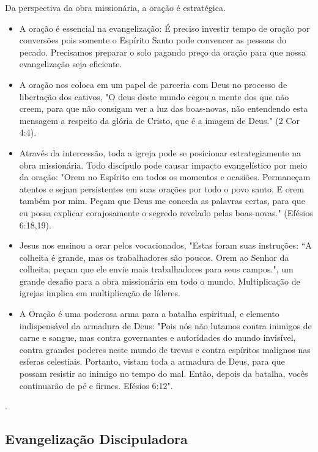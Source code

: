 \documentclass[
	12pt,				%
	openright,			%
	twoside,			%
	a4paper,			%
	english,			%
	french,				%
	spanish,			%
	brazil				%
	]{abntex2}
\begin{document}
  Da perspectiva da obra missionária, a oração é estratégica.
  \begin{itemize}
	\item A oração é essencial na evangelização: É preciso investir tempo de oração por conversões pois somente o Espírito Santo pode convencer as pessoas do pecado. Precisamos preparar o solo pagando preço da oração para que nossa evangelização seja eficiente.
	\item A oração nos coloca em um papel de parceria com Deus no processo de libertação dos cativos, "O deus deste mundo cegou a mente dos que não creem, para que não consigam ver a luz das boas-novas, não entendendo esta mensagem a respeito da glória de Cristo, que é a imagem de Deus." (2 Cor 4:4).
	\item Através da intercessão, toda a igreja pode se posicionar estrategiamente na obra missionária. Todo discípulo pode causar impacto evangelístico por meio da oração: "Orem no Espírito em todos os momentos e ocasiões. Permaneçam atentos e sejam persistentes em suas orações por todo o povo santo. E orem também por mim. Peçam que Deus me conceda as palavras certas, para que eu possa explicar corajosamente o segredo revelado pelas boas-novas." (Efésios 6:18,19).
	\item Jesus nos ensinou a orar pelos vocacionados, "Estas foram suas instruções: “A colheita é grande, mas os trabalhadores são poucos. Orem ao Senhor da colheita; peçam que ele envie mais trabalhadores para seus campos.", um grande desafio para a obra missionária em todo o mundo. Multiplicação de igrejas implica em multiplicação de líderes.
	\item A Oração é uma poderosa arma para a batalha espiritual, e elemento indispensável da armadura de Deus: "Pois nós não lutamos contra inimigos de carne e sangue, mas contra governantes e autoridades do mundo invisível, contra grandes poderes neste mundo de trevas e contra espíritos malignos nas esferas celestiais. Portanto, vistam toda a armadura de Deus, para que possam resistir ao inimigo no tempo do mal. Então, depois da batalha, vocês continuarão de pé e firmes. Efésios 6:12".
  \end{itemize}\cite[32-34]{brandao}.

\subsection{Evangelização Discipuladora}
\end{document}
